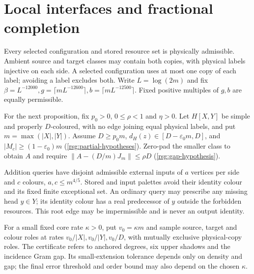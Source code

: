 \section{Local interfaces and fractional completion}
\label{rsg:section}\label{rpf:section}\label{sg:sec:inputs}

Every selected configuration and stored resource set is physically
admissible. Ambient source and target classes may contain both copies,
with physical labels injective on each side. A selected configuration
uses at most one copy of each label; avoiding a label excludes both.
Write $L=\log(2m)$ and fix $\beta=L^{-12000},g=\lceil{}mL^{-12600}\rceil,b=\lceil{}mL^{-12500}\rceil$. Fixed positive multiples of $g,b$ are equally permissible.

For the next proposition, fix $p_0>0$, $0\le\rho<1$ and $\eta>0$. Let $H[X,Y]$ be simple and properly $D$-coloured, with no edge joining equal physical labels, and put $m=\max(|X|,|Y|)$. Assume $D\ge{}p_0m$, $d_H(z)\in[D-\varepsilon_0m,D]$, and $|M_c|\ge(1-\varepsilon_0)m$ \label{rsg:partial-hypotheses}\textup{(\ref{rsg:partial-hypotheses})}. Zero-pad the smaller class to obtain $A$ and require $\|A-(D/m)J_m\|\le\rho{}D$ \label{rsg:gap-hypothesis}\textup{(\ref{rsg:gap-hypothesis})}.

Addition queries have disjoint admissible external inputs of $a$ vertices per side and $c$ colours, $a,c\le{}m^{4/5}$. Stored and input palettes avoid their identity colour and its fixed finite exceptional set. An ordinary query may prescribe any missing head $y\in{}Y$; its identity colour has a real predecessor of $y$ outside the forbidden resources. This root edge may be impermissible and is never an output identity.

For a small fixed core rate $\kappa>0$, put $v_0=\kappa{}m$ and sample source, target and colour roles at rates $v_0/|X|,v_0/|Y|,v_0/D$, with mutually exclusive physical-copy roles. The certificate refers to anchored degrees, six upper shadows and the incidence Gram gap. Its small-extension tolerance depends only on density and gap; the final error threshold and order bound may also depend on the chosen $\kappa$.

